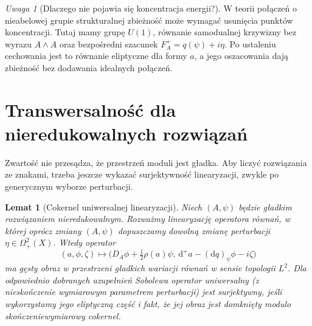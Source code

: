 \documentclass[11pt,a4paper]{report}
\numberwithin{equation}{section}
\theoremstyle{plain}
\newtheorem{lemat}[twierdzenie]{Lemat}
\theoremstyle{definition}
\theoremstyle{remark}
\newtheorem{uwaga}[twierdzenie]{Uwaga}
\begin{document}
\begin{uwaga}[Dlaczego nie pojawia się koncentracja energii?]
W teorii połączeń o nieabelowej grupie strukturalnej
zbieżność może wymagać usunięcia punktów koncentracji.
Tutaj mamy grupę $U(1)$, równanie samodualnej krzywizny
bez wyrazu $A\wedge A$ oraz bezpośredni szacunek
$F_A^+=q(\psi)+i\eta$. Po ustaleniu cechowania jest to
równanie eliptyczne dla formy $a$, a jego oszacowania
dają zbieżność bez dodawania idealnych połączeń.
\end{uwaga}

\section{Transwersalność dla nieredukowalnych rozwiązań}
\label{sec:tg-sw12-transversality}

Zwartość nie przesądza, że przestrzeń moduli jest gładka.
Aby liczyć rozwiązania ze znakami, trzeba jeszcze wykazać
surjektywność linearyzacji, zwykle po generycznym wyborze
perturbacji.

\begin{lemat}[Cokernel uniwersalnej linearyzacji]
\label{lem:tg-sw12-surj}
Niech $(A,\psi)$ będzie gładkim rozwiązaniem nieredukowalnym.
Rozważmy linearyzację operatora równań, w której oprócz
zmiany $(A,\psi)$ dopuszczamy dowolną zmianę perturbacji
$\eta\in\Omega^2_+(X)$. Wtedy operator
\[
(a,\phi,\zeta)\longmapsto
\bigl(D_A\phi+\tfrac12\rho(a)\psi,\,
\mathrm d^+a-(\mathrm dq)_\psi\phi-i\zeta\bigr)
\]
ma gęsty obraz w przestrzeni gładkich wariacji równań
w sensie topologii $L^2$. Dla odpowiednio dobranych
uzupełnień Sobolewa operator uniwersalny (z nieskończenie
wymiarowym parametrem perturbacji) jest surjektywny,
jeśli wykorzystamy jego eliptyczną część i fakt, że
jej obraz jest domknięty modulo skończeniewymiarowy cokernel.
\end{lemat}
\end{document}
